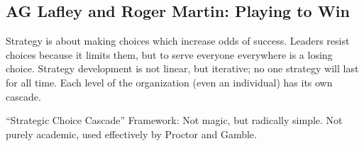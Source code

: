 \documentclass[
]{article}
\begin{document}
\hypertarget{ag-lafley-and-roger-martin-playing-to-win}{%
\subsection{AG Lafley and Roger Martin: Playing to
Win}\label{ag-lafley-and-roger-martin-playing-to-win}}

Strategy is about making choices which increase odds of success. Leaders
resist choices because it limits them, but to serve everyone everywhere
is a losing choice. Strategy development is not linear, but iterative;
no one strategy will last for all time. Each level of the organization
(even an individual) has its own cascade.

``Strategic Choice Cascade'' Framework: Not magic, but radically simple.
Not purely academic, used effectively by Proctor and Gamble.
\end{document}
